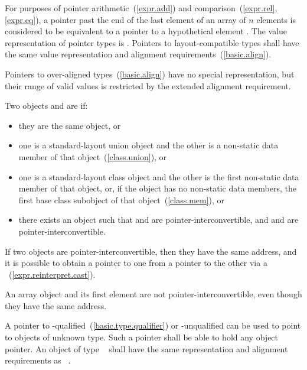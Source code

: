 For purposes of pointer arithmetic~(\ref{expr.add})
and comparison~(\ref{expr.rel}, \ref{expr.eq}),
a pointer past the end of the last element of
an array  of $n$ elements
is considered to be equivalent to
a pointer to a hypothetical element .
The value representation of
pointer types is . Pointers to
layout-compatible types shall
have the same value representation and alignment
requirements~(\ref{basic.align}).
\begin{note} Pointers to over-aligned types~(\ref{basic.align}) have no special
representation, but their range of valid values is restricted by the extended
alignment requirement.\end{note}

\pnum
Two objects  and  are  if:
\begin{itemize}
\item
they are the same object, or
\item
one is a standard-layout union object and
the other is a non-static data member of that object~(\ref{class.union}), or
\item
one is a standard-layout class object and
the other is the first non-static data member of that object, or,
if the object has no non-static data members,
the first base class subobject of that object~(\ref{class.mem}), or
\item
there exists an object  such that
 and  are pointer-interconvertible, and
 and  are pointer-interconvertible.
\end{itemize}
If two objects are pointer-interconvertible,
then they have the same address,
and it is possible to obtain a pointer to one
from a pointer to the other
via a ~(\ref{expr.reinterpret.cast}).
\begin{note}
An array object and its first element are not pointer-interconvertible,
even though they have the same address.
\end{note}

\pnum
{}%
%
A pointer to \cv-qualified~(\ref{basic.type.qualifier}) or \cv-unqualified
can be used to point to objects of
unknown type. Such a pointer shall be able to hold any object pointer.
An object of type \cv{}~
shall have the same representation and alignment
requirements as \cv{}~.


